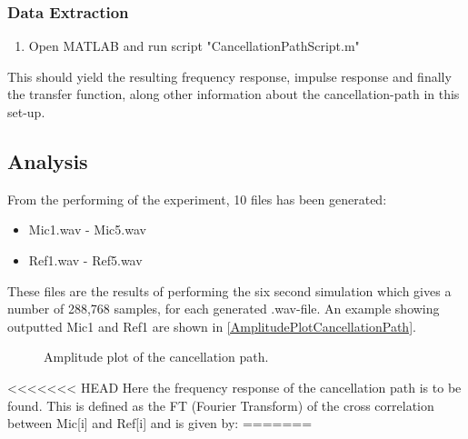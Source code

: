 \subsubsection{Data Extraction}
\begin{enumerate}
	\item Open MATLAB\textsuperscript{\textregistered} and run script "CancellationPathScript.m"
\end{enumerate}
This should yield the resulting frequency response, impulse response and finally the transfer function, along other information about the cancellation-path in this set-up.

\subsection{Analysis}

From the performing of the experiment, 10 files has been generated:
\begin{itemize}
	\item Mic1.wav - Mic5.wav
	\item Ref1.wav - Ref5.wav
\end{itemize}

These files are the results of performing the six second simulation which gives a number of 288,768 samples, for each generated .wav-file.
An example showing outputted Mic1 and Ref1 are shown in  \autoref{AmplitudePlotCancellationPath}.

\begin{figure}[H]
	\centering
	
	\caption{Amplitude plot of the cancellation path.}
	\label{AmplitudePlotCancellationPath}
\end{figure}

<<<<<<< HEAD
Here the frequency response of the cancellation path is to be found. This is defined as the FT (Fourier Transform) of the cross correlation between Mic[i] and Ref[i] and is given by:
=======

